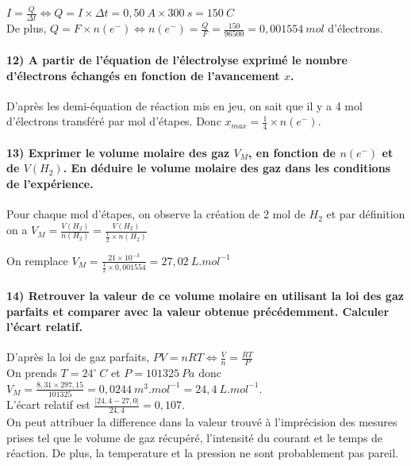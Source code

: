 \documentclass[a4paper, 12pt]{scrartcl}
\newcommand{\mdg}{^{\circ}}
\begin{document}
$I = \frac{Q}{\Delta t} \iff Q = I \times \Delta t = 0,50\ \si{A} \times 300\ \si{s} = 150\ \si{C}$ \\[2mm]
De plus, $Q = F \times n\left( e^- \right) \iff n\left( e^- \right) = \frac{Q}{F} = \frac{150}{96500} = 0,001554\ \si{mol}$ d'électrons.

\paragraph*{12) A partir de l'équation de l'électrolyse exprimé le nombre d'électrons échangés en fonction de l'avancement $x$. \\[5mm]}

D'après les demi-équation de réaction mis en jeu, on sait que il y a 4 mol d'électrons transféré par mol d'étapes. Donc $x_{max} = \frac{1}{4} \times n\left( e^- \right)$.

\paragraph*{13) Exprimer le volume molaire des gaz $V_M$, en fonction de $n\left( e^- \right)$ et de $V\left( H_2 \right)$.
En déduire le volume molaire des gaz dans les conditions de l'expérience. \\[5mm]}

Pour chaque mol d'étapes, on observe la création de 2 mol de $H_2$ et par définition on a $V_M = \frac{V\left( H_2 \right)}{n\left( H_2 \right)} = \frac{V\left( H_2 \right)}{\frac{1}{2}\times n\left( H_2 \right)}$

On remplace $V_M = \frac{21\times 10^{-3}}{\frac{1}{2}\times 0,001554} = 27,02\ \si{L.mol^{-1}}$

\paragraph*{14) Retrouver la valeur de ce volume molaire en utilisant la loi des gaz parfaits et comparer avec la valeur obtenue précédemment. Calculer l'écart relatif. \\[5mm]}

D'après la loi de gaz parfaits, $PV = nRT \iff \frac{V}{n} = \frac{RT}{P}$ \\
On prends $T = 24\mdg\ \si{C}$ et $P = 101325\ \si{Pa}$ donc \\
$V_M = \frac{8,31 \times 297,15}{101325} = 0,0244 \ \si{m^3.mol^{-1}} = 24,4\ \si{L.mol^{-1}}$.
\\[2mm]
L'écart relatif est $\frac{|24,4-27,0|}{24,4} = 0,107$. \\
On peut attribuer la difference dans la valeur trouvé à l'imprécision des mesures prises tel que le volume de gaz récupéré, 
l'intensité du courant et le temps de réaction. De plus, la temperature et la pression ne sont probablement pas pareil.
\end{document}
